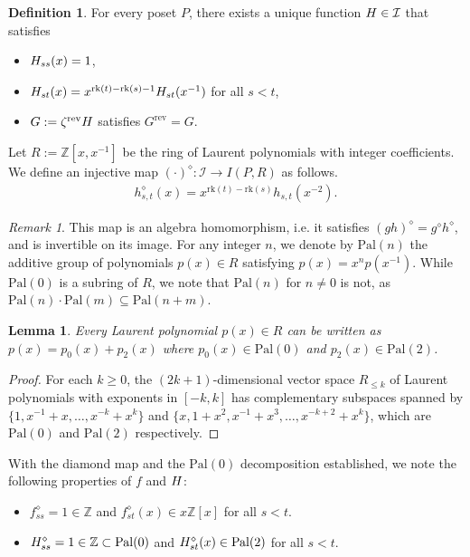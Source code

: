 \documentclass{article}
\newcommand{\rev}{\mathrm{rev}}
\newcommand{\rk}{\text{rk}}
\newcommand{\chow}{\normalfont{H}}
\newcommand{\Pal}[1]{\mathrm{Pal}(#1)}
\newtheorem{lemma}[theorem]{Lemma}
\theoremstyle{definition}
\newtheorem{definition}[theorem]{Definition}
\theoremstyle{remark}
\newtheorem{remark}[theorem]{Remark}
\begin{document}
\begin{definition}
    For every poset \(P\), there exists a unique function \(\chow\in \mathcal{I}\) that satisfies
    \begin{itemize}
        \item \(\chow_{ss}(x) = 1\),
        \item \(\chow_{st}(x) = x^{\rk(t)-\rk(s)-1}\chow_{st}(x^{-1})\) for all \(s < t\),
        \item \(G:= \zeta^{\rev} \chow\) satisfies
            \(G^{\rev} = G\).
    \end{itemize}
\end{definition}

Let \(R:=\mathbb{Z}[x, x^{-1}]\) be the ring of Laurent polynomials with integer coefficients.
We define an injective map \((\cdot)^{\diamond}\colon \mathcal{I} \to I(P, R)\)
as follows.
\begin{align*}
  h^{\diamond}_{s, t}(x) = x^{\rk(t)-\rk(s)} h_{s,t}(x^{-2}).
\end{align*}
\begin{remark}
This map is an algebra homomorphism, i.e. it satisfies
\((gh)^{\diamond} = g^{\diamond} h^{\diamond}\), and is invertible on its image.
For any integer \(n\), we denote by \(\Pal{n}\) the additive group of polynomials \(p(x) \in R\)
satisfying \(p(x) = x^n p(x^{-1})\). While \(\Pal{0}\) is a subring of \(R\), we note that
\(\Pal{n}\) for \(n \neq 0\) is not, as \(\Pal{n} \cdot \Pal{m} \subseteq \Pal{n+m}\).
\end{remark}

\begin{lemma}
    Every Laurent polynomial \(p(x) \in R\) can be written as \(p(x) = p_0(x) + p_2(x)\)
    where \(p_0(x) \in \Pal{0}\) and \(p_2(x) \in \Pal{2}\).
\end{lemma}
\begin{proof}
    For each \(k\ge 0\), the \((2k+1)\)-dimensional vector space
    \(R_{\le k}\)
    of Laurent polynomials with exponents in \([-k,k]\)
    has complementary subspaces spanned by \(\{1, x^{-1}+x, \ldots, x^{-k}+x^k\}\)
    and \(\{x, 1 + x^2, x^{-1} + x^{3}, \ldots, x^{-k+2} + x^{k}\}\),
    which are \(\Pal{0}\) and \(\Pal{2}\) respectively.
\end{proof}

With the diamond map and the $\Pal{0}$ decomposition established,
we note the following properties of $f$ and $\chow$:
\begin{itemize}
  \item \(f^\diamond_{ss} = 1 \in \mathbb{Z}\) and
        \(f^\diamond_{st}(x) \in x\mathbb{Z}[x]\) for all \(s < t\).
  \item \(\chow^\diamond_{ss} = 1 \in \mathbb{Z} \subset \Pal{0}\) and
        \(\chow^\diamond_{st}(x) \in \Pal{2}\) for all \(s < t\).
\end{itemize}
\end{document}
